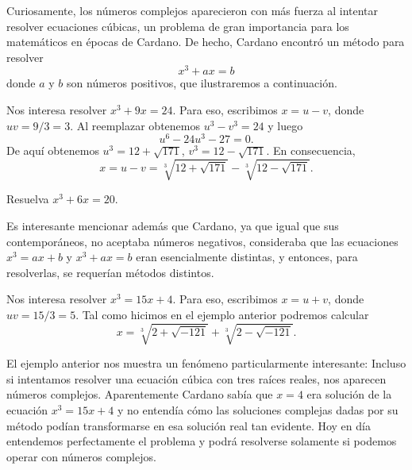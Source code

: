 Curiosamente, los números complejos aparecieron con más fuerza al intentar
resolver ecuaciones cúbicas, un problema de gran importancia para los
matemáticos en épocas de Cardano. De hecho, Cardano encontró un método para
resolver 
\[
	x^3+ax=b
\]
donde $a$ y $b$ son números positivos, que ilustraremos a continuación.

\begin{example}
	Nos interesa resolver $x^3+9x=24$. Para eso, escribimos $x=u-v$, donde
	$uv=9/3=3$. Al reemplazar obtenemos $u^3-v^3=24$ y luego 
	\[
		u^6-24u^3-27=0. 
	\]
	De aquí obtenemos $u^3=12+\sqrt{171}$, $v^3=12-\sqrt{171}$. En
	consecuencia, 
	\[
		x=u-v=\sqrt[3]{12+\sqrt{171}}-\sqrt[3]{12-\sqrt{171}}.
	\]
\end{example}

\begin{exercise}
	Resuelva $x^3+6x=20$.
\end{exercise}

Es interesante mencionar además que Cardano, ya que igual que sus
contemporáneos, no aceptaba números negativos, consideraba que las ecuaciones
$x^3=ax+b$ y $x^3+ax=b$ eran esencialmente distintas, y entonces, para
resolverlas, se requerían métodos distintos.

\begin{example}
	Nos interesa resolver $x^3=15x+4$. Para eso, escribimos $x=u+v$, donde
	$uv=15/3=5$. Tal como hicimos en el ejemplo anterior podremos calcular
	\[
		x=\sqrt[3]{2+\sqrt{-121}}+\sqrt[3]{2-\sqrt{-121}}.
	\]

\end{example}

El ejemplo anterior nos muestra un fenómeno particularmente interesante:
Incluso si intentamos resolver una ecuación cúbica con tres raíces reales, nos
aparecen números complejos. Aparentemente Cardano sabía que $x=4$ era solución
de la ecuación $x^3=15x+4$ y no entendía cómo las soluciones complejas dadas
por su método podían transformarse en esa solución real tan evidente. Hoy en
día entendemos perfectamente el problema y podrá resolverse solamente si
podemos operar con números complejos. 



%

